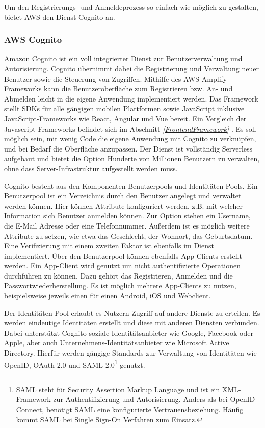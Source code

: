 {Um den Registrierungs- und Anmeldeprozess so einfach wie möglich zu gestalten, bietet AWS den Dienst Cognito an.

\subsubsection{AWS Cognito}
\label{Cognito}
Amazon Cognito ist ein voll integrierter Dienst zur Benutzerverwaltung und Autorisierung.
Cognito übernimmt dabei die Registrierung und Verwaltung neuer Benutzer sowie die Steuerung von Zugriffen.
Mithilfe des AWS Amplify-Frameworks kann die Benutzeroberfläche zum Registrieren bzw. An- und Abmelden leicht in die eigene Anwendung implementiert werden.
Das Framework stellt SDKs für alle gängigen mobilen Plattformen sowie JavaScript inklusive JavaScript-Frameworks wie React, Angular und Vue bereit.
Ein Vergleich der Javascript-Frameworks befindet sich im Abschnitt \textit{\ref{FrontendFramework} }.
Es soll möglich sein, mit wenig Code die eigene Anwendung mit Cognito zu verknüpfen, und bei Bedarf die Oberfläche anzupassen.
Der Dienst ist vollständig Serverless aufgebaut und bietet die Option \glqq Hunderte von Millionen Benutzern\grqq{} zu verwalten,
\glqq ohne dass Server-Infrastruktur aufgestellt werden muss.\grqq \cite{CognitoUebersicht} \cite{Cognito2}

Cognito besteht aus den Komponenten Benutzerpools und Identitäten-Pools.
Ein Benutzerpool ist ein Verzeichnis durch den Benutzer angelegt und verwaltet werden können.
Hier können Attribute konfiguriert werden, z.B. mit welcher Information sich Benutzer anmelden können.
Zur Option stehen ein Username, die E-Mail Adresse oder eine Telefonnummer.
Außerdem ist es möglich weitere Attribute zu setzen, wie etwa das Geschlecht, der Wohnort, das Geburtsdatum.
Eine Verifizierung mit einem zweiten Faktor ist ebenfalls im Dienst implementiert.
Über den Benutzerpool können ebenfalls App-Clients erstellt werden.
Ein App-Client wird genutzt um nicht authentifizierte Operationen durchführen zu können.
Dazu gehört das Registrieren, Anmelden und die Passwortwiederherstellung.
Es ist möglich mehrere App-Clients zu nutzen, beispielsweise jeweils einen für einen Android, iOS und Webclient.

Der Identitäten-Pool erlaubt es Nutzern Zugriff auf andere Dienste zu erteilen. Es werden eindeutige Identitäten erstellt und diese mit anderen Diensten verbunden.
Dabei unterstützt Cognito soziale Identitätsanbieter wie Google, Facebook oder Apple, aber auch Unternehmens-Identitätsanbieter wie Microsoft Active Directory.
Hierfür werden gängige Standards zur Verwaltung von Identitäten wie OpenID, OAuth 2.0 und SAML 2.0\footnote{SAML steht für Security Assertion Markup Language und ist ein XML-Framework zur  Authentifizierung und Autorisierung.
Anders als bei OpenID Connect, benötigt SAML eine konfigurierte Vertrauensbeziehung. Häufig kommt SAML bei Single Sign-On Verfahren zum Einsatz. } genutzt. \cite{Cognito1}

}

